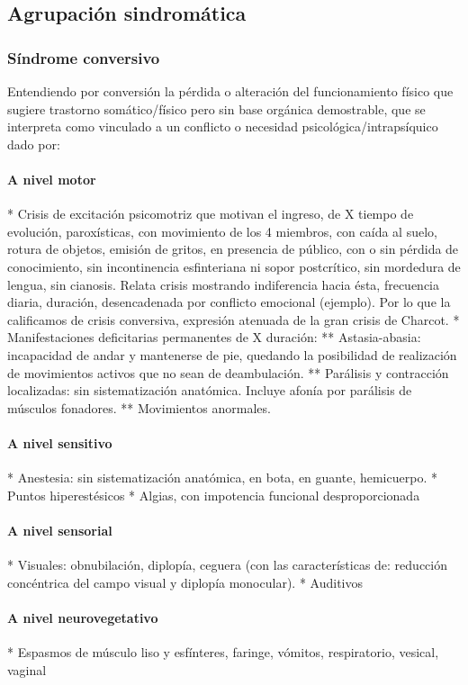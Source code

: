 \documentclass{scrbook}
\begin{document}
\subsection*{Agrupación sindromática}
\subsubsection*{Síndrome conversivo}
Entendiendo por conversión la pérdida o alteración del funcionamiento físico que sugiere trastorno somático/físico pero sin base orgánica demostrable, que se interpreta como vinculado a un conflicto o necesidad psicológica/intrapsíquico dado por:
\paragraph{A nivel motor}
* Crisis de excitación psicomotriz que motivan el ingreso, de X tiempo de evolución, paroxísticas, con movimiento de los 4 miembros, con caída al suelo, rotura de objetos, emisión de gritos, en presencia de público, con o sin pérdida de conocimiento, sin incontinencia esfinteriana ni sopor postcrítico, sin mordedura de lengua, sin cianosis. Relata crisis mostrando indiferencia hacia ésta, frecuencia diaria, duración, desencadenada por conflicto emocional (ejemplo). Por lo que la calificamos de crisis conversiva, expresión atenuada de la gran crisis de Charcot.
* Manifestaciones deficitarias permanentes de X duración:
** Astasia-abasia: incapacidad de andar y mantenerse de pie, quedando la posibilidad de realización de movimientos activos que no sean de deambulación.
** Parálisis y contracción localizadas: sin sistematización anatómica. Incluye afonía por parálisis de músculos fonadores.
** Movimientos anormales.
\paragraph{A nivel sensitivo}
* Anestesia: sin sistematización anatómica, en bota, en guante, hemicuerpo.
* Puntos hiperestésicos
* Algias, con impotencia funcional desproporcionada
\paragraph{A nivel sensorial}
* Visuales: obnubilación, diplopía, ceguera (con las características de: reducción concéntrica del campo visual y diplopía monocular).
* Auditivos
\paragraph{A nivel neurovegetativo}
* Espasmos de músculo liso y esfínteres, faringe, vómitos, respiratorio, vesical, vaginal
\end{document}
